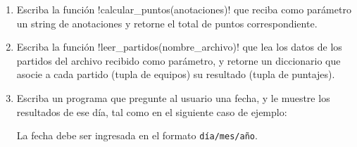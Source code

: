 \begin{enumerate}[leftmargin=0pt,label=\emph{\alph*})]

  \item
    Escriba la función \li!calcular_puntos(anotaciones)!
    que reciba como parámetro un string de anotaciones
    y retorne el total de puntos correspondiente.
    

  \item
    Escriba la función \li!leer_partidos(nombre_archivo)!
    que lea los datos de los partidos del archivo recibido como parámetro,
    y retorne un diccionario
    que asocie a cada partido (tupla de equipos)
    su resultado (tupla de puntajes).
    

  \item
    Escriba un programa que pregunte al usuario una fecha,
    y le muestre los resultados de ese día,
    tal como en el siguiente caso de ejemplo:

    \begin{minipage}[t]{0.6\textwidth}
      
    \end{minipage}

    La fecha debe ser ingresada
    en el formato \texttt{día/mes/año}.

\end{enumerate}
